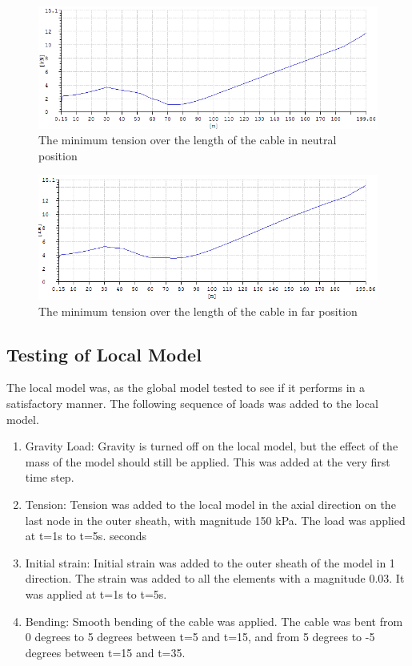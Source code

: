 \begin{figure}[H]
\centering
\includegraphics[scale=0.5]{figures/fminneu}
\caption{The minimum tension over the length of the cable in neutral position}
 \label{fig:fminneu}
\end{figure}


\begin{figure}[H]
\centering
\includegraphics[scale=0.5]{figures/fminfar}
\caption{The minimum tension over the length of the cable in far position}
 \label{fig:fminfar}
\end{figure}



\subsection{Testing of Local Model}



The local model was, as the global model tested to see if it performs in a satisfactory manner. The following sequence of loads was added to the local model. 
\begin{enumerate}
    \item Gravity Load: Gravity is turned off on the local model, but the effect of the mass of the model should still be applied. This was added at the very first time step.
    \item Tension: Tension was added to the local model in the axial direction on the last node in the outer sheath, with magnitude 150 kPa. The load was applied at t=1s to t=5s. seconds
    \item Initial strain: Initial strain was added to the outer sheath of the model in 1 direction. The strain was added to all the elements with a magnitude 0.03. It was applied at t=1s to t=5s.
    \item Bending: Smooth bending of the cable was applied. The cable was bent from 0 degrees to 5 degrees between t=5 and t=15, and from 5 degrees to -5 degrees between t=15 and t=35.  
\end{enumerate}


